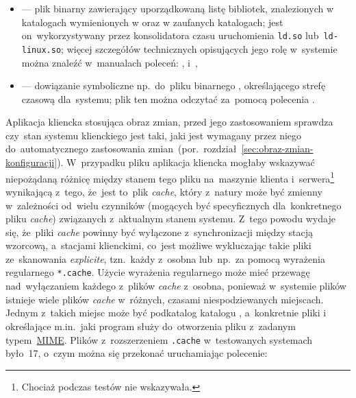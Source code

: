 \documentclass[thesis]{subfiles}
\begin{document}
\begin{itemize}
	\item \href{https://linux.die.net/man/8/ldconfig}{} --- plik binarny zawierający uporządkowaną listę bibliotek, znalezionych w katalogach wymienionych w  oraz w zaufanych katalogach; jest on~wykorzystywany przez konsolidatora czasu uruchomienia \texttt{ld.so} lub~\texttt{ld-linux.so}; więcej szczegółów technicznych opisujących jego rolę w~systemie można znaleźć w~manualach poleceń: ,  i~,
	\item {} --- dowiązanie symboliczne np.~do~pliku binarnego , określającego strefę czasową dla~systemu; plik ten można odczytać za~pomocą polecenia .
\end{itemize}

Aplikacja kliencka stosująca obraz zmian, przed jego zastosowaniem sprawdza czy~stan systemu klienckiego jest taki, jaki jest wymagany przez niego do~automatycznego zastosowania zmian~(por.~rozdział~\ref{sec:obraz-zmian-konfiguracji}). W~przypadku pliku  aplikacja kliencka mogłaby wskazywać niepożądaną różnicę między stanem tego pliku na~maszynie klienta i~serwera\footnote{Chociaż podczas testów nie wskazywała.} wynikającą z~tego, że~jest to~plik \emph{cache}, który z~natury może być zmienny w~zależności od~wielu czynników (mogących być specyficznych dla~konkretnego pliku \emph{cache}) związanych z~aktualnym stanem systemu. Z~tego powodu wydaje się, że~pliki \emph{cache} powinny być wyłączone z~synchronizacji między stacją wzorcową, a~stacjami klienckimi, co~jest możliwe wykluczając takie pliki ze~skanowania \emph{explicite}, tzn.~każdy z~osobna lub~np.~za pomocą wyrażenia regularnego \texttt{*.cache}. Użycie wyrażenia regularnego może mieć przewagę nad~wyłączaniem każdego z~plików \emph{cache} z~osobna, ponieważ w~systemie plików istnieje wiele plików \emph{cache} w~różnych, czasami niespodziewanych miejscach. Jednym z~takich miejsc może być podkatalog katalogu , a~konkretnie pliki  i~ określające m.in.~jaki program służy do~otworzenia pliku z~zadanym typem~\href{https://en.wikipedia.org/wiki/Media_type}{MIME}. Plików z~rozszerzeniem \texttt{.cache} w~testowanych systemach było~17, o~czym można się przekonać uruchamiając polecenie:
\end{document}
